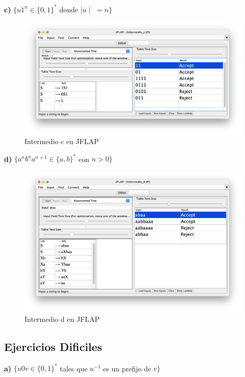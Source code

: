 \textbf{c)}  $\{ u1^{n} \in \{0,1\}^{\ast} $ donde $\mid u \mid$ $= n \}$

\begin{figure}[H] 
	\centering
	\includegraphics[scale=0.35]{../practica_1/images/intermedio_c.png} 
	\caption{Intermedio c en JFLAP} 
    \label{fig:intermedio_c}
\end{figure}

\textbf{d)}  $\{ a^{n} b^{n} a^{n+1} \in \{a,b\}^{\ast}$ con $n > 0\}$

\begin{figure}[H] 
	\centering
	\includegraphics[scale=0.35]{../practica_1/images/intermedio_d.png} 
	\caption{Intermedio d en JFLAP} 
    \label{fig:intermedio_d}
\end{figure}

\subsection{Ejercicios Dificiles}

\textbf{a)}  $\{ u0v \in \{0,1\}^{\ast} $ tales que $u^{-1}$ es un prefijo de $v\}$


